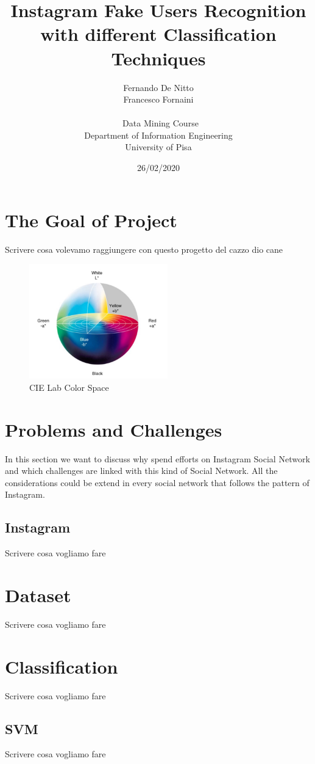 \documentclass{article}
\title{Instagram Fake Users Recognition with different Classification Techniques}
\date{26/02/2020}
\author{Fernando De Nitto\\Francesco Fornaini\\\\\ Data Mining Course\\ Department of Information Engineering\\ University of Pisa\\}
\begin{document}
\maketitle


\section{The Goal of Project}
Scrivere cosa volevamo raggiungere con questo progetto del cazzo dio cane

 \begin{figure}[!h]
 \center
  \includegraphics[width=170pt]{img/cielab.jpg}
  \caption{CIE Lab Color Space}
  \label{fig:cielab}
\end{figure}

\section{Problems and Challenges}
In this section we want to discuss why spend efforts on Instagram Social Network and which challenges are linked with this kind of Social Network. All the considerations could be extend in every social network that follows the pattern of Instagram.

\subsection{Instagram}
Scrivere cosa vogliamo fare

\section{Dataset}
Scrivere cosa vogliamo fare


\section{Classification}
Scrivere cosa vogliamo fare

\subsection{SVM}
Scrivere cosa vogliamo fare
\end{document}
